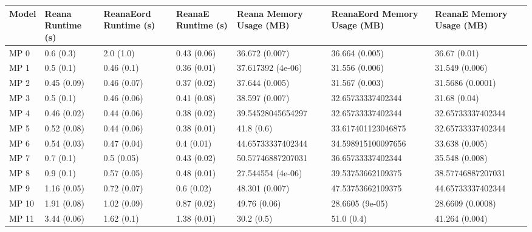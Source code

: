 \begin{tabular}{lllllll}
\toprule
Model & Reana Runtime (s) & ReanaEord Runtime (s) & ReanaE Runtime (s) & Reana Memory Usage (MB) & ReanaEord Memory Usage (MB) & ReanaE Memory Usage (MB) \\
\midrule
 MP 0 &         0.6 (0.3) &             2.0 (1.0) &        0.43 (0.06) &          36.672 (0.007) &              36.664 (0.005) &             36.67 (0.01) \\
 MP 1 &         0.5 (0.1) &            0.46 (0.1) &        0.36 (0.01) &       37.617392 (4e-06) &              31.556 (0.006) &           31.549 (0.006) \\
 MP 2 &       0.45 (0.09) &           0.46 (0.07) &        0.37 (0.02) &          37.644 (0.005) &              31.567 (0.003) &         31.5686 (0.0001) \\
 MP 3 &         0.5 (0.1) &           0.46 (0.06) &        0.41 (0.08) &          38.597 (0.007) &           32.65733337402344 &             31.68 (0.04) \\
 MP 4 &       0.46 (0.02) &           0.44 (0.06) &        0.38 (0.02) &       39.54528045654297 &           32.65733337402344 &        32.65733337402344 \\
 MP 5 &       0.52 (0.08) &           0.44 (0.06) &        0.38 (0.01) &              41.8 (0.6) &          33.617401123046875 &        32.65733337402344 \\
 MP 6 &       0.54 (0.03) &           0.47 (0.04) &         0.4 (0.01) &       44.65733337402344 &          34.598915100097656 &           33.638 (0.005) \\
 MP 7 &         0.7 (0.1) &            0.5 (0.05) &        0.43 (0.02) &       50.57746887207031 &           36.65733337402344 &           35.548 (0.008) \\
 MP 8 &         0.9 (0.1) &           0.57 (0.05) &        0.48 (0.01) &       27.544554 (4e-06) &           39.53753662109375 &        38.57746887207031 \\
 MP 9 &       1.16 (0.05) &           0.72 (0.07) &         0.6 (0.02) &          48.301 (0.007) &           47.53753662109375 &        44.65733337402344 \\
MP 10 &       1.91 (0.08) &           1.02 (0.09) &        0.87 (0.02) &            49.76 (0.06) &             28.6605 (9e-05) &         28.6609 (0.0008) \\
MP 11 &       3.44 (0.06) &            1.62 (0.1) &        1.38 (0.01) &              30.2 (0.5) &                  51.0 (0.4) &           41.264 (0.004) \\

\end{tabular}
